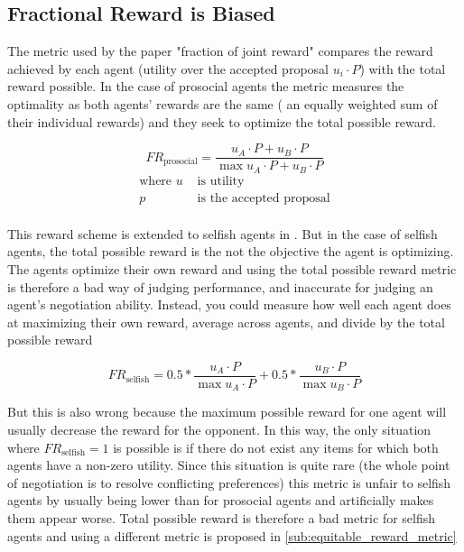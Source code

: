 \documentclass{article}
\begin{document}
\subsection{Fractional Reward is Biased}%
\label{sub:fractional_reward_is_biased}
The metric used by the paper "fraction of joint reward" compares the reward
achieved by each agent (utility over the accepted proposal $u_i \cdot P$) with
the total reward possible. In the case of prosocial
agents the metric measures the optimality as both agents' rewards are the same (
an equally weighted sum of their individual rewards) and they seek to optimize
the total possible reward.

\begin{equation}
    FR_{\text{prosocial}} = \frac{u_A \cdot P + u_B \cdot P}{\max u_A \cdot P + u_B \cdot P}
\end{equation}
\begin{align*}
    \text{where } u & \text{ is utility} \\
                  p & \text{ is the accepted proposal} \\
\end{align*}

This reward scheme is extended to selfish agents in \cite{cao2018emergent}.
But in the case of selfish agents, the total possible reward is the not the
objective the agent is optimizing. The agents optimize their own reward and
using the total possible reward metric is therefore a bad way of judging
performance, and inaccurate for judging an agent's negotiation ability.
Instead, you could measure how well each agent does at maximizing
their own reward, average across agents, and divide by the total possible reward

\begin{equation}
    FR_{\text{selfish}} = 0.5 * \frac{u_A \cdot P}{\max u_A \cdot P} + 0.5 * \frac{u_B \cdot P}{\max u_B \cdot P}
\end{equation}

But this is also wrong because the maximum possible reward for one agent will
usually decrease the reward for the opponent. In this way, the only situation where
$FR_{\text{selfish}} = 1$ is possible is if there do not exist any items for
which both agents have a non-zero utility. Since this situation is quite rare
(the whole point of negotiation is to resolve conflicting preferences) this
metric is unfair to selfish agents by usually being lower than for prosocial
agents and artificially makes them appear worse. Total possible reward is
therefore a bad metric for selfish agents and using a different metric is
proposed in \ref{sub:equitable_reward_metric}
\end{document}
